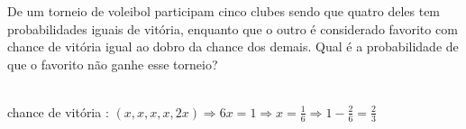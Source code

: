 \begin{ex}
 De um torneio de voleibol participam cinco clubes sendo que quatro deles tem probabilidades iguais de vitória, enquanto que o outro é considerado favorito com chance de vitória igual ao dobro da chance dos demais. Qual é a probabilidade de que o favorito não ganhe esse torneio?
   \begin{sol}
       \phantom{A} \\
     chance de vitória : $(x,x,x,x,2x) \Longrightarrow 6x=1
      \Longrightarrow x=\frac{1}{6} \Longrightarrow 1-\frac{2}{6}=\frac{2}{3}$
   \end{sol}
\end{ex}
